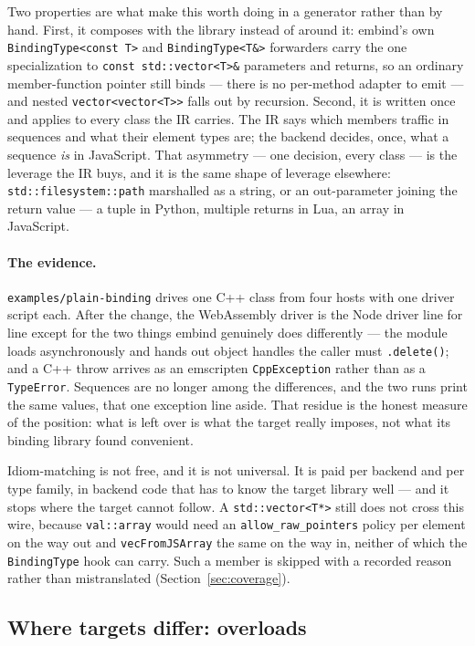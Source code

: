 \documentclass[11pt,a4paper]{article}
\newcommand{\code}[1]{\texttt{\small #1}}
\begin{document}
Two properties are what make this worth doing in a generator rather than by
hand. First, it composes with the library instead of around it: embind's own
\code{BindingType<const T>} and \code{BindingType<T\&>} forwarders carry the one
specialization to \code{const std::vector<T>\&} parameters and returns, so an
ordinary member-function pointer still binds --- there is no per-method adapter
to emit --- and nested \code{vector<vector<T>>} falls out by recursion. Second,
it is written once and applies to every class the IR carries. The IR says which
members traffic in sequences and what their element types are; the backend
decides, once, what a sequence \emph{is} in JavaScript. That asymmetry --- one
decision, every class --- is the leverage the IR buys, and it is the same shape
of leverage elsewhere: \code{std::filesystem::path} marshalled as a string, or
an out-parameter joining the return value --- a tuple in Python, multiple
returns in Lua, an array in JavaScript.

\paragraph{The evidence.} \code{examples/plain-binding} drives one C++ class
from four hosts with one driver script each. After the change, the WebAssembly
driver is the Node driver line for line except for the two things embind
genuinely does differently --- the module loads asynchronously and hands out
object handles the caller must \code{.delete()}; and a C++ throw arrives as an
emscripten \code{CppException} rather than as a \code{TypeError}. Sequences are
no longer among the differences, and the two runs print the same values, that
one exception line aside. That residue is the honest measure of the position:
what is left over is what the target really imposes, not what its binding
library found convenient.

Idiom-matching is not free, and it is not universal. It is paid per backend and
per type family, in backend code that has to know the target library well ---
and it stops where the target cannot follow. A \code{std::vector<T*>} still does
not cross this wire, because \code{val::array} would need an
\code{allow\_raw\_pointers} policy per element on the way out and
\code{vecFromJSArray} the same on the way in, neither of which the
\code{BindingType} hook can carry. Such a member is skipped with a recorded
reason rather than mistranslated (Section~\ref{sec:coverage}).

\subsection{Where targets differ: overloads}
\label{sec:overloads}
\end{document}
